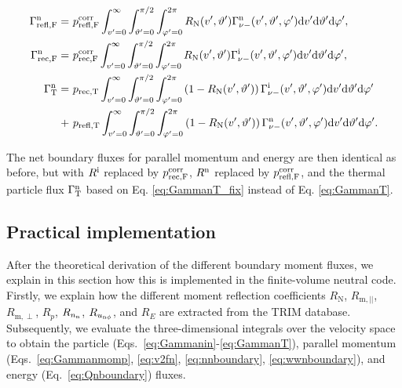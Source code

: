 \begin{align}
\Gamma_{\mathrm{refl},\mathrm{F}}^{\mathrm{n}} =& \ p_{\mathrm{refl,F}}^{\mathrm{corr}} \int_{v'=0}^{\infty} \int_{\vartheta'=0}^{\pi/2} \int_{\varphi'=0}^{2\pi} R_{\mathrm{N}}(v',\vartheta') \Gamma_{\nu-}^{\mathrm{n}}(v',\vartheta',\varphi') \mathrm{d} v' \mathrm{d} \vartheta' \mathrm{d} \varphi', \label{eq:Gammarefl_fix} \\
\Gamma_{\mathrm{rec},\mathrm{F}}^{\mathrm{n}} =& \ p_{\mathrm{rec,F}}^{\mathrm{corr}} \int_{v'=0}^{\infty} \int_{\vartheta'=0}^{\pi/2} \int_{\varphi'=0}^{2\pi} R_{\mathrm{N}}(v',\vartheta') \Gamma_{\nu-}^{\mathrm{i}}(v',\vartheta',\varphi') \mathrm{d} v' \mathrm{d} \vartheta' \mathrm{d} \varphi', \label{eq:Gammarec_fix} \\
\Gamma_{\mathrm{T}}^{\mathrm{n}} =& \ p_{\mathrm{rec,T}} \int_{v'=0}^{\infty} \int_{\vartheta'=0}^{\pi/2} \int_{\varphi'=0}^{2\pi} \left( 1 - R_{\mathrm{N}}(v',\vartheta') \right) \Gamma_{\nu -}^{\mathrm{i}}(v',\vartheta',\varphi') \mathrm{d} v' \mathrm{d} \vartheta' \mathrm{d} \varphi' \nonumber \\
+ & \ p_{\mathrm{refl,T}} \int_{v'=0}^{\infty} \int_{\vartheta'=0}^{\pi/2} \int_{\varphi'=0}^{2\pi} \left( 1 - R_{\mathrm{N}}(v',\vartheta') \right) \Gamma_{\nu -}^{\mathrm{n}}(v',\vartheta',\varphi') \mathrm{d} v' \mathrm{d} \vartheta' \mathrm{d} \varphi' . \label{eq:GammanT_fix}
\end{align}

The net boundary fluxes for parallel momentum and energy are then identical as before, but with $R^{\mathrm{i}}$ replaced by $p_{\mathrm{rec,F}}^{\mathrm{corr}}$, $R^{\mathrm{n}}$ replaced by $p_{\mathrm{refl,F}}^{\mathrm{corr}}$, and the thermal particle flux $\Gamma_{\mathrm{T}}^{\mathrm{n}}$ based on Eq. \eqref{eq:GammanT_fix} instead of Eq. \eqref{eq:GammanT}.

\subsection{Practical implementation} \label{sec:bcimplementation}

After the theoretical derivation of the different boundary moment fluxes, we explain in this section how this is implemented in the finite-volume neutral code. Firstly, we explain how the different moment reflection coefficients $R_{\mathrm{N}}$, $R_{\mathrm{m},||}$, $R_{\mathrm{m},\perp}$, $R_{p}$, $R_{n_{\mathrm{n}}}$, $R_{u_{\mathrm{n}\phi}}$, and $R_{E}$ are extracted from the TRIM database. Subsequently, we evaluate the three-dimensional integrals over the velocity space to obtain the particle (Eqs.~\eqref{eq:Gammanin}-\eqref{eq:GammanT}), parallel momentum (Eqs.~\eqref{eq:Gammanmomp}, \eqref{eq:v2fn}, \eqref{eq:nnboundary}, \eqref{eq:wwnboundary}), and energy (Eq.~\eqref{eq:Qnboundary}) fluxes.

